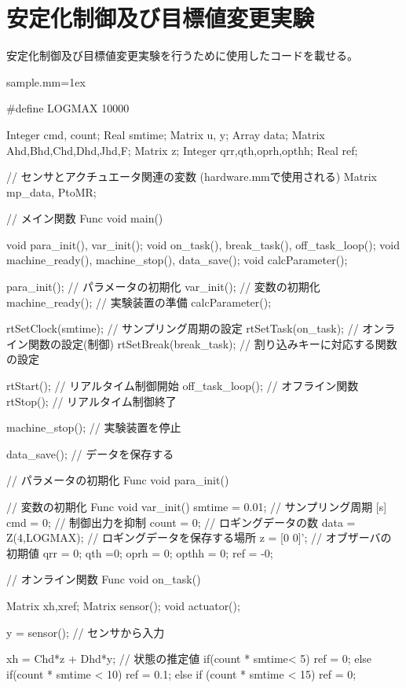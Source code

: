 \section{安定化制御及び目標値変更実験}
	安定化制御及び目標値変更実験を行うために使用したコードを載せる。
	\begin{breakitembox}[l]{sample.mm}\baselineskip=1ex
		\begin{verbatimtab}[4]
		
#define LOGMAX 10000

Integer cmd, count;
Real smtime;
Matrix u, y;
Array data;
Matrix Ahd,Bhd,Chd,Dhd,Jhd,F;
Matrix z;
Integer qrr,qth,oprh,opthh;
Real ref;

// センサとアクチュエータ関連の変数 (hardware.mmで使用される)
Matrix mp_data, PtoMR;

// メイン関数
Func void main()
{
	void para_init(), var_init();
	void on_task(), break_task(), off_task_loop();
	void machine_ready(), machine_stop(), data_save();
	void calcParameter();

	para_init();			// パラメータの初期化
	var_init();             // 変数の初期化
	machine_ready();        // 実験装置の準備
	calcParameter();

	rtSetClock(smtime);     // サンプリング周期の設定
	rtSetTask(on_task);		// オンライン関数の設定(制御)
	rtSetBreak(break_task); // 割り込みキーに対応する関数の設定

	rtStart();              // リアルタイム制御開始
	off_task_loop();        // オフライン関数
	rtStop();               // リアルタイム制御終了

	machine_stop();         // 実験装置を停止

	data_save();			// データを保存する
}

// パラメータの初期化
Func void para_init()
{
}

// 変数の初期化
Func void var_init()
{
	smtime = 0.01;		// サンプリング周期 [s]
	cmd = 0;			// 制御出力を抑制
	count = 0;			// ロギングデータの数
	data = Z(4,LOGMAX); // ロギングデータを保存する場所
	z = [0 0]';            // オブザーバの初期値
	qrr = 0;
	qth =0;
	oprh = 0;
	opthh = 0;
ref = -0;
}

// オンライン関数
Func void on_task()
{
	Matrix xh,xref;
	Matrix sensor();
	void actuator();

	y = sensor();				// センサから入力

	xh = Chd*z + Dhd*y; // 状態の推定値
	if(count * smtime< 5){
		ref = 0;
	} else if(count * smtime < 10){
		ref = 0.1;
	} else if (count * smtime < 15){
		ref = 0;
	}

}
\end{verbatimtab}
\end{breakitembox}
